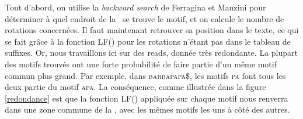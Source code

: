 Tout d'abord, on utilise la \textit{backward search} de Ferragina et Manzini pour déterminer à quel endroit de la \kbwt\ se trouve le motif, et on calcule le nombre de rotations concernées. Il faut maintenant retrouver sa position dans le texte, ce qui se fait grâce à la fonction LF() pour les rotations n'étant pas dans le tableau de suffixes. Or, nous travaillons ici sur des reads, donnée très redondante. La plupart des motifs trouvés ont une forte probabilité de faire partie d'un même motif commun plus grand. Par exemple, dans \textsc{barbapapa\$}, les motifs \textsc{pa} font tous les deux partie du motif \textsc{apa}. La conséquence, comme illustrée dans la figure \ref{redondance}  est que la fonction LF() appliquée sur chaque motif nous renverra dans une zone commune de la \kbwt, avec les mêmes motifs les uns à côté des autres.


